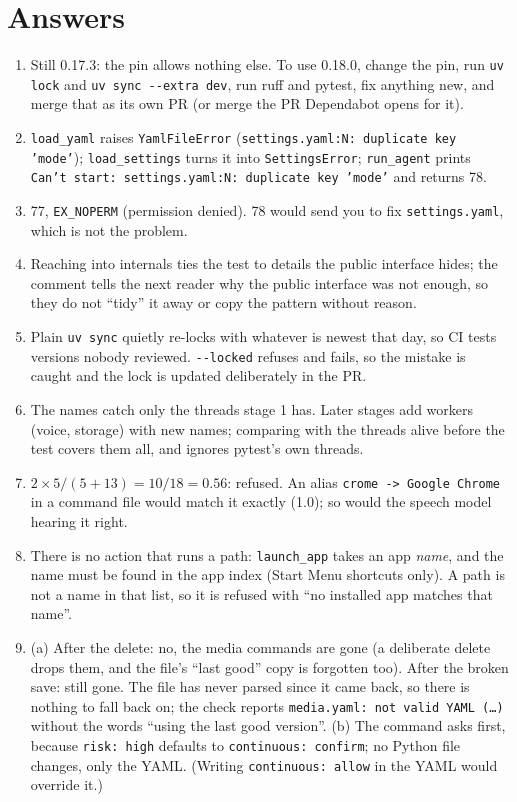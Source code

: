 \documentclass[11pt,a4paper]{article}
\begin{document}
\section{Answers}\label{sec:answers}
\begin{enumerate}[label=\textbf{\arabic*.}]
  \item Still 0.17.3: the pin allows nothing else. To use 0.18.0, change the pin, run
        \texttt{uv lock} and \texttt{uv sync -{}-extra dev}, run ruff and pytest, fix anything
        new, and merge that as its own PR (or merge the PR Dependabot opens for it).
  \item \texttt{load\_yaml} raises \texttt{YamlFileError} (\texttt{settings.yaml:N: duplicate key
        'mode'}); \texttt{load\_settings} turns it into \texttt{SettingsError}; \texttt{run\_agent}
        prints \texttt{Can't start: settings.yaml:N: duplicate key 'mode'} and returns 78.
  \item 77, \texttt{EX\_NOPERM} (permission denied). 78 would send you to fix
        \texttt{settings.yaml}, which is not the problem.
  \item Reaching into internals ties the test to details the public interface hides; the comment
        tells the next reader why the public interface was not enough, so they do not ``tidy'' it
        away or copy the pattern without reason.
  \item Plain \texttt{uv sync} quietly re-locks with whatever is newest that day, so CI tests
        versions nobody reviewed. \texttt{-{}-locked} refuses and fails, so the mistake is caught
        and the lock is updated deliberately in the PR.
  \item The names catch only the threads stage 1 has. Later stages add workers (voice, storage)
        with new names; comparing with the threads alive before the test covers them all, and
        ignores pytest's own threads.
  \item $2 \times 5 / (5 + 13) = 10/18 = 0.56$: refused. An alias \texttt{crome -> Google
        Chrome} in a command file would match it exactly (1.0); so would the speech model hearing
        it right.
  \item There is no action that runs a path: \texttt{launch\_app} takes an app \emph{name}, and
        the name must be found in the app index (Start Menu shortcuts only). A path is not a name
        in that list, so it is refused with ``no installed app matches that name''.
  \item (a) After the delete: no, the media commands are gone (a deliberate delete drops them, and
        the file's ``last good'' copy is forgotten too). After the broken save: still gone. The
        file has never parsed since it came back, so there is nothing to fall back on; the check
        reports \texttt{media.yaml: not valid YAML (\ldots)} without the words ``using the last
        good version''. (b) The command asks first, because \texttt{risk: high} defaults to
        \texttt{continuous: confirm}; no Python file changes, only the YAML. (Writing
        \texttt{continuous: allow} in the YAML would override it.)
\end{enumerate}
\end{document}
